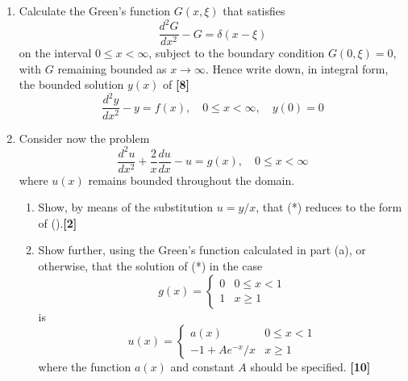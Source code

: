 \documentclass[a4paper]{article}
\begin{document}
\begin{qns}\leavevmode
\begin{enumerate}[label=(\alph*)]
\item Calculate the Green’s function $G(x,\xi)$ that satisfies
$$\frac{d^2G}{dx^2}-G=\delta(x-\xi)$$
on the interval $0\leq x<\infty$, subject to the boundary condition $G(0, \xi) = 0$, with $G$ remaining bounded as $x\rightarrow\infty$. Hence write down, in integral form, the bounded solution $y(x)$ of
\hfill\textbf{[8]}
\begin{equation}
    \frac{d^2y}{dx^2}-y=f(x),\quad0\leq x<\infty,\quad y(0)=0\tag{\dag}
\end{equation}
\item Consider now the problem
\begin{equation}
    \frac{d^2u}{dx^2}+\frac{2}{x}\frac{du}{dx}-u=g(x),\quad0\leq x<\infty\tag{*}
\end{equation}
where $u(x)$ remains bounded throughout the domain.
\begin{enumerate}[label=(\roman*)]
\item Show, by means of the substitution $u=y/x$, that (*) reduces to the form of (\dag).\hfill\textbf{[2]}
\item Show further, using the Green’s function calculated in part (a), or otherwise, that the solution of (*) in the case
$$g(x)=
\left\{
        \begin{array}{ll}
      0 & 0\leq x<1 \\
      1 & x\geq1
        \end{array}
    \right.$$
is
$$u(x)=
\left\{
        \begin{array}{ll}
      a(x) & 0\leq x<1 \\
      -1+Ae^{-x}/x & x\geq1
        \end{array}
    \right.$$
where the function $a(x)$ and constant $A$ should be specified. \hfill\textbf{[10]}
\end{enumerate}
\end{enumerate}
\end{qns}
\end{document}
